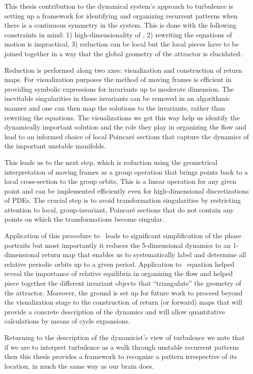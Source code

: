 
This thesis contribution to the dynamical system's approach to
turbulence is setting up a framework for identifying and
organizing recurrent patterns when there is a continuous
symmetry in the system. This is done with the following
constraints in mind: 1) high-dimensionality of \statesp, 2)
rewriting the equations of motion is impractical, 3) reduction
can be local but the local pieces have to be joined together in
a way that the global geometry of the attractor is elucidated.

Reduction is performed along two axes: visualization and construction of return maps.
For visualization purposes the method of moving frames is efficient in providing
symbolic expressions for invariants up to moderate dimension. The inevitable singularities
in those invariants can be removed in an algorithmic manner and one can then map the
solutions to the invariants, rather than rewriting the equations. The visualizations
we get this way help us identify the dynamically important solution and the role they
play in organizing the flow and lead to an informed choice of local Poincar\'e sections
that capture the dynamics of the important unstable manifolds.

This leads us to the next step, which is reduction using the geometrical interpretation
of moving frames as a group operation that brings points back to a local cross-section to the
group orbits. This is a linear operation for any given point and can be implemented efficiently
even for high-dimensional discretizations of PDEs. The crucial step is to avoid transformation
singularities by restricting attention to local, group-invariant, Poincar\'e sections that
do not contain any points on which the transformations become singular.

Application of this procedure to \CLe\ leads to significant simplification of the phase portraits
but most importantly it reduces the 5-dimensional dynamics to an 1-dimensional return map that enables us to systematically label and determine all relative periodic orbits up to a given period. Application
to \KS\ equation helped reveal the importance of relative equilibria in organizing the flow and helped piece together the different invariant objects that ``triangulate'' the geometry of the attractor.
Moreover, the ground is set up for future work to proceed beyond the visualization stage to the construction of return (or forward) maps that will provide a concrete description of the dynamics
and will allow quantitative calculations by means of cycle expansions.

Returning to the description of the dynamicist's view of turbulence we note that if we are to
interpret turbulence as a walk through unstable recurrent patterns then this thesis provides
a framework to recognize a pattern irrespective of its location, in much the same way as our brain
does.

